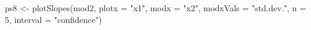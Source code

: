 \begin{Schunk}
\begin{Sinput}
 ps8 <- plotSlopes(mod2, plotx = "x1", modx = "x2", modxVals = "std.dev.", n = 5, interval = "confidence")
\end{Sinput}
\end{Schunk}
